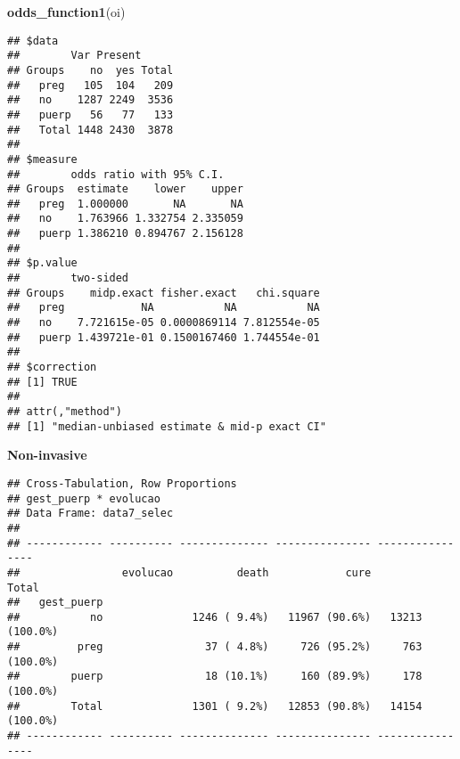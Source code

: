 \documentclass[
]{article}
\newenvironment{Shaded}{\begin{snugshade}}{\end{snugshade}}
\newcommand{\DataTypeTok}[1]{\textcolor[rgb]{0.13,0.29,0.53}{#1}}
\newcommand{\KeywordTok}[1]{\textcolor[rgb]{0.13,0.29,0.53}{\textbf{#1}}}
\newcommand{\NormalTok}[1]{#1}
\newcommand{\OperatorTok}[1]{\textcolor[rgb]{0.81,0.36,0.00}{\textbf{#1}}}
\newcommand{\OtherTok}[1]{\textcolor[rgb]{0.56,0.35,0.01}{#1}}
\newcommand{\StringTok}[1]{\textcolor[rgb]{0.31,0.60,0.02}{#1}}
\begin{document}
\begin{Shaded}
\begin{Highlighting}[]
\KeywordTok{odds_function1}\NormalTok{(oi)}
\end{Highlighting}
\end{Shaded}

\begin{verbatim}
## $data
##        Var Present
## Groups    no  yes Total
##   preg   105  104   209
##   no    1287 2249  3536
##   puerp   56   77   133
##   Total 1448 2430  3878
## 
## $measure
##        odds ratio with 95% C.I.
## Groups  estimate    lower    upper
##   preg  1.000000       NA       NA
##   no    1.763966 1.332754 2.335059
##   puerp 1.386210 0.894767 2.156128
## 
## $p.value
##        two-sided
## Groups    midp.exact fisher.exact   chi.square
##   preg            NA           NA           NA
##   no    7.721615e-05 0.0000869114 7.812554e-05
##   puerp 1.439721e-01 0.1500167460 1.744554e-01
## 
## $correction
## [1] TRUE
## 
## attr(,"method")
## [1] "median-unbiased estimate & mid-p exact CI"
\end{verbatim}

\textbf{Non-invasive}

\begin{Shaded}
\end{Shaded}

\begin{Shaded}
\end{Shaded}

\begin{verbatim}
## Cross-Tabulation, Row Proportions  
## gest_puerp * evolucao  
## Data Frame: data7_selec  
## 
## ------------ ---------- -------------- --------------- ----------------
##                evolucao          death            cure            Total
##   gest_puerp                                                           
##           no              1246 ( 9.4%)   11967 (90.6%)   13213 (100.0%)
##         preg                37 ( 4.8%)     726 (95.2%)     763 (100.0%)
##        puerp                18 (10.1%)     160 (89.9%)     178 (100.0%)
##        Total              1301 ( 9.2%)   12853 (90.8%)   14154 (100.0%)
## ------------ ---------- -------------- --------------- ----------------
\end{verbatim}
\end{document}
